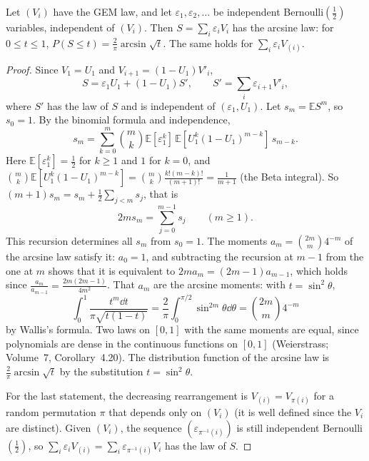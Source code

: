 \begin{lemma}\label{lem:gemarcsine}
Let $(V_i)$ have the GEM law, and let $\varepsilon_1,\varepsilon_2,\dots$ be independent Bernoulli$(\frac12)$ variables, independent of $(V_i)$. Then $S=\sum_i\varepsilon_iV_i$ has the arcsine law: for $0\le t\le1$, $P(S\le t)=\frac2\pi\arcsin\sqrt t$. The same holds for $\sum_i\varepsilon_iV_{(i)}$.
\end{lemma}
\begin{proof}
Since $V_1=U_1$ and $V_{i+1}=(1-U_1)V'_i$,
\[
S=\varepsilon_1U_1+(1-U_1)S',\qquad S'=\sum_i\varepsilon_{i+1}V'_i,
\]
where $S'$ has the law of $S$ and is independent of $(\varepsilon_1,U_1)$. Let $s_m=\mathbb ES^m$, so $s_0=1$. By the binomial formula and independence,
\[
s_m=\sum_{k=0}^m\binom mk\mathbb E[\varepsilon_1^k]\,\mathbb E[U_1^k(1-U_1)^{m-k}]\,s_{m-k}.
\]
Here $\mathbb E[\varepsilon_1^k]=\frac12$ for $k\ge1$ and $1$ for $k=0$, and $\binom mk\mathbb E[U_1^k(1-U_1)^{m-k}]=\binom mk\frac{k!(m-k)!}{(m+1)!}=\frac1{m+1}$ (the Beta integral). So $(m+1)s_m=s_m+\frac12\sum_{j<m}s_j$, that is
\[
2ms_m=\sum_{j=0}^{m-1}s_j\qquad(m\ge1).
\]
This recursion determines all $s_m$ from $s_0=1$. The moments $a_m=\binom{2m}m4^{-m}$ of the arcsine law satisfy it: $a_0=1$, and subtracting the recursion at $m-1$ from the one at $m$ shows that it is equivalent to $2ma_m=(2m-1)a_{m-1}$, which holds since $\frac{a_m}{a_{m-1}}=\frac{2m(2m-1)}{4m^2}$. That $a_m$ are the arcsine moments: with $t=\sin^2\theta$,
\[
\int_0^1\frac{t^m\dd t}{\pi\sqrt{t(1-t)}}=\frac2\pi\int_0^{\pi/2}\sin^{2m}\theta\dd\theta=\binom{2m}m4^{-m}
\]
by Wallis's formula. Two laws on $[0,1]$ with the same moments are equal, since polynomials are dense in the continuous functions on $[0,1]$ (Weierstrass; Volume~7, Corollary~4.20). The distribution function of the arcsine law is $\frac2\pi\arcsin\sqrt t$ by the substitution $t=\sin^2\theta$.

For the last statement, the decreasing rearrangement is $V_{(i)}=V_{\pi(i)}$ for a random permutation $\pi$ that depends only on $(V_i)$ (it is well defined since the $V_i$ are distinct). Given $(V_i)$, the sequence $(\varepsilon_{\pi^{-1}(i)})$ is still independent Bernoulli$(\frac12)$, so $\sum_i\varepsilon_iV_{(i)}=\sum_i\varepsilon_{\pi^{-1}(i)}V_i$ has the law of $S$.
\end{proof}

